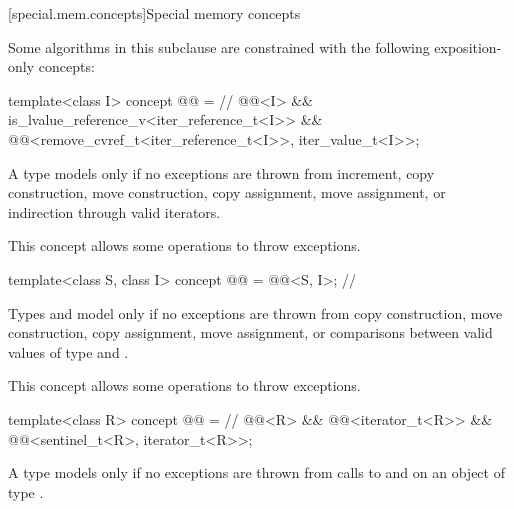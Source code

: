 [special.mem.concepts]{Special memory concepts}

\pnum
Some algorithms in this subclause are constrained with the following
exposition-only concepts:
\begin{itemdecl}
template<class I>
concept @@ = // \expos
  @@<I> &&
  is_lvalue_reference_v<iter_reference_t<I>> &&
  @@<remove_cvref_t<iter_reference_t<I>>, iter_value_t<I>>;
\end{itemdecl}

\begin{itemdescr}
\pnum
A type  models  only if
no exceptions are thrown from increment,
copy construction, move construction,
copy assignment, move assignment,
or indirection through valid iterators.

\pnum
\begin{note}
This concept allows some 
operations to throw exceptions.
\end{note}
\end{itemdescr}

\begin{itemdecl}
template<class S, class I>
concept @@ = @@<S, I>; // \expos
\end{itemdecl}

\begin{itemdescr}
\pnum
Types  and  model 
only if no exceptions are thrown from copy construction, move construction,
copy assignment, move assignment, or comparisons between
valid values of type  and .

\pnum
\begin{note}
This concept allows some 
operations to throw exceptions.
\end{note}
\end{itemdescr}

\begin{itemdecl}
template<class R>
concept @@ = // \expos
  @@<R> &&
  @@<iterator_t<R>> &&
  @@<sentinel_t<R>, iterator_t<R>>;
\end{itemdecl}

\begin{itemdescr}
\pnum
A type  models  only if
no exceptions are thrown from calls to  and
 on an object of type .
\end{itemdescr}

